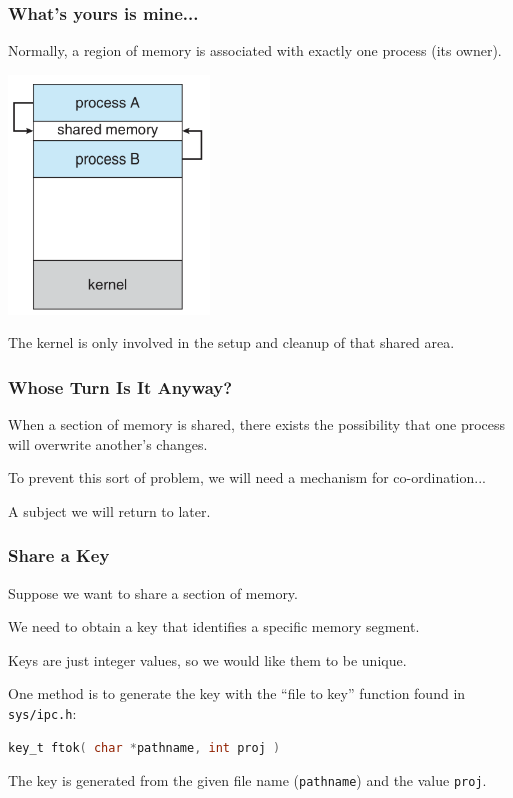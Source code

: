\begin{frame}
\frametitle{What's yours is mine...}

Normally, a region of memory is associated with exactly one process (its owner).


\begin{center}
	\includegraphics[width=0.4\textwidth]{images/shared-memory.png}
\end{center}

The kernel is only involved in the setup and cleanup of that shared area.

\end{frame}


\begin{frame}
\frametitle{Whose Turn Is It Anyway?}

When a section of memory is shared, there exists the possibility that one process will overwrite another's changes.

To prevent this sort of problem, we will need a mechanism for co-ordination... 

A subject we will return to later.

\end{frame}


\begin{frame}[fragile]
\frametitle{Share a Key}

Suppose we want to share a section of memory. 

We need to obtain a \alert{key} that identifies a specific memory segment. 

Keys are just integer values, so we would like them to be unique.

One method is to generate the key with the ``file to key'' function found in \texttt{sys/ipc.h}:
\begin{lstlisting}[language=C]
key_t ftok( char *pathname, int proj )
\end{lstlisting}

The key is generated from the given file name (\texttt{pathname}) and the value \texttt{proj}.

\end{frame}



